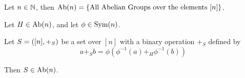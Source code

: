 \begin{definition}
    Let \( n \in \mathbb{N} \), then \( \operatorname{Ab}(n) = \left\{  \text{All Abelian Groups over the elements } [n] \right\} \).
\end{definition}

\begin{theorem} \label{thm:abelian-conjugacy}
    Let \( H \in \operatorname{Ab}(n) \), and let \( \phi \in \operatorname{Sym}(n) \).

    Let \( S = \left( [n], +_S \right) \) be a set over \( [n] \) with a binary operation \( +_S \) defined by
    \begin{equation} \label{eq:abelian-conjugacy}
        a +_S b = \phi(\phi^{-1}(a) +_H \phi^{-1}(b))
    \end{equation}
    
    Then \( S \in \operatorname{Ab}(n) \).
\end{theorem}
